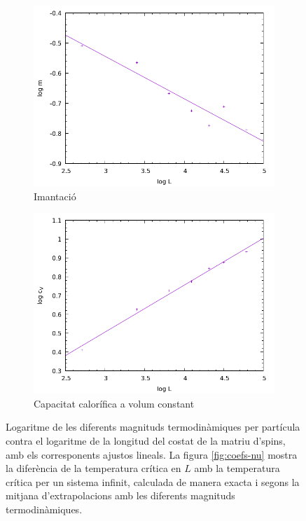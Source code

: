 \documentclass[a4paper]{article}
\begin{document}
\begin{figure}[H]
\begin{subfigure}{.45\textwidth}
        \centering
        \includegraphics[width=\textwidth]{coefs-betanu.png}
        \caption{Imantació}
        \label{fig:coefs-betanu}
    \end{subfigure}
    \begin{subfigure}{.45\textwidth}
        \centering
        \includegraphics[width=\textwidth]{coefs-alphanu.png}
        \caption{Capacitat calorífica a volum constant}
        \label{fig:coefs-alphanu}
    \end{subfigure}
    \caption{Logaritme de les diferents magnituds termodinàmiques per partícula contra el logaritme de la longitud del costat de la matriu d'spins, amb els corresponents ajustos lineals. La figura \ref{fig:coefs-nu} mostra la diferència de la temperatura crítica en $L$ amb la temperatura crítica per un sistema infinit, calculada de manera exacta i segons la mitjana d'extrapolacions amb les diferents magnituds termodinàmiques.}
\label{fig:coefs}
\end{figure}
\end{document}
